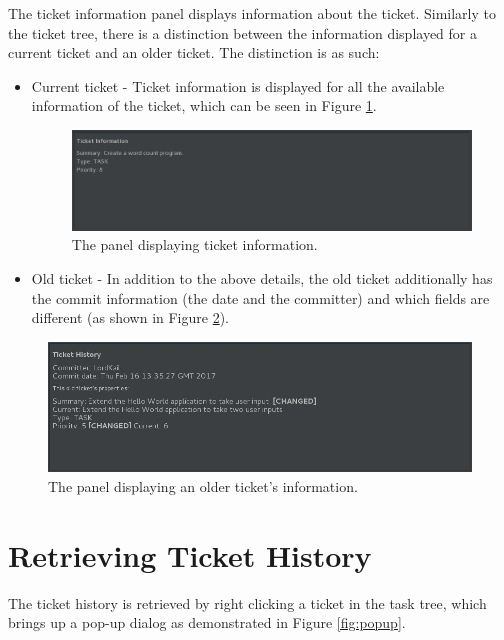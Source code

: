 \documentclass{4thYearProject}
\begin{document}
The ticket information panel displays information about the ticket. Similarly to the ticket tree, there is a distinction between the information displayed for a current ticket and an older ticket. The distinction is as such:

\begin{itemize}
\item Current ticket - Ticket information is displayed for all the available information of the ticket, which can be seen in Figure \ref{fig:ticketpanel}.

\begin{figure}[H]
\includegraphics[scale=0.6]{Ticket_infopanel}
\centering
\caption{The panel displaying ticket information.}\label{ticketpanel}
\label{fig:ticketpanel}
\end{figure}

\item Old ticket - In addition to the above details, the old ticket additionally has the commit information (the date and the committer) and which fields are different (as shown in Figure \ref{fig:oldticketpanel}).
\end{itemize}

\begin{figure}[H]
\includegraphics[scale=0.7]{OldTicket_infopanelV2}
\centering
\caption{The panel displaying an older ticket's information.}\label{oldticketpanel}
\label{fig:oldticketpanel}
\end{figure}

\section{Retrieving Ticket History}

The ticket history is retrieved by right clicking a ticket in the task tree, which brings up a pop-up dialog as demonstrated in Figure \ref{fig:popup}.
\end{document}
